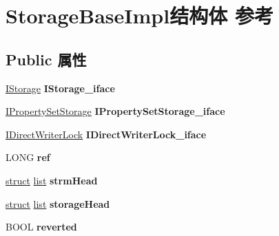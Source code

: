 \hypertarget{struct_storage_base_impl}{}\section{Storage\+Base\+Impl结构体 参考}
\label{struct_storage_base_impl}
\subsection*{Public 属性}
\begin{DoxyCompactItemize}
\item 
\mbox{\label{struct_storage_base_impl_ab084f71b6b74a4b75901737dfbccc110}} 
\hyperlink{interface_i_storage}{I\+Storage} {\bfseries I\+Storage\+\_\+iface}
\item 
\mbox{\label{struct_storage_base_impl_a4d90e7ddc8201eae1301d286fa849efc}} 
\hyperlink{interface_i_property_set_storage}{I\+Property\+Set\+Storage} {\bfseries I\+Property\+Set\+Storage\+\_\+iface}
\item 
\mbox{\label{struct_storage_base_impl_a72874b1091cb21a67225f1c53916a8cd}} 
\hyperlink{interface_i_direct_writer_lock}{I\+Direct\+Writer\+Lock} {\bfseries I\+Direct\+Writer\+Lock\+\_\+iface}
\item 
\mbox{\label{struct_storage_base_impl_a5ced54072bf13430b040eb147844586b}} 
L\+O\+NG {\bfseries ref}
\item 
\mbox{\label{struct_storage_base_impl_a1ec6b46e5927bf85073455e5f06a3410}} 
\hyperlink{interfacestruct}{struct} \hyperlink{classlist}{list} {\bfseries strm\+Head}
\item 
\mbox{\label{struct_storage_base_impl_aebce4c60296dd058dbf3c7ccfb1e9751}} 
\hyperlink{interfacestruct}{struct} \hyperlink{classlist}{list} {\bfseries storage\+Head}
\item 
\mbox{\label{struct_storage_base_impl_a8a625be0d99dcb6102f79fa0b05a0349}} 
B\+O\+OL {\bfseries reverted}
\item 
\mbox{\label{struct_storage_base_impl_aa4cd29b388e18cc91c4d198e5748fee8}} 

\end{DoxyCompactItemize}
